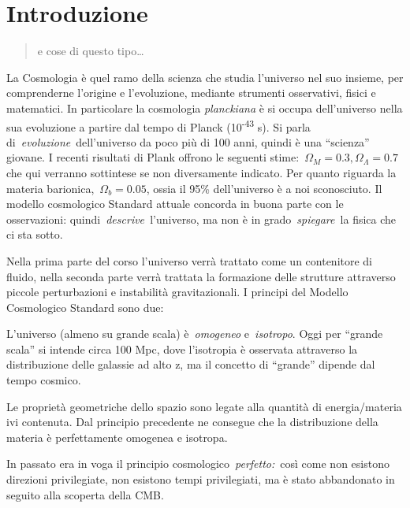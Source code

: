 \chapter{Introduzione}\label{1:chintro}

\begin{quote}
e cose di questo tipo\ldots{}
\end{quote}

La Cosmologia è quel ramo della scienza che studia l'universo nel suo
insieme, per comprenderne l'origine e l'evoluzione, mediante strumenti
osservativi, fisici e matematici. In particolare la
cosmologia \emph{planckiana} è si occupa dell'universo nella sua
evoluzione a partire dal tempo di Planck (10\textsuperscript{-43} s). Si
parla di~\emph{evoluzione}~dell'universo da poco più di 100 anni, quindi
è una ``scienza'' giovane. I recenti risultati di Plank offrono le
seguenti stime:~\(\Omega_{M}=0.3, \Omega_{\Lambda}=0.7\) che qui verranno sottintese se non
diversamente indicato. Per quanto riguarda la materia
barionica,~\(\Omega_b=0.05\), ossia il 95\% dell'universo è a noi
sconosciuto. Il modello cosmologico Standard attuale concorda in buona
parte con le osservazioni: quindi~\emph{descrive~}l'universo, ma non è
in grado~\emph{spiegare~}la fisica che ci sta sotto.

Nella prima parte del corso l'universo verrà trattato come un
contenitore di fluido, nella seconda parte verrà trattata la formazione
delle strutture attraverso piccole perturbazioni e instabilità
gravitazionali. I principi del Modello Cosmologico Standard sono due:

\begin{theorem}
L'universo (almeno su grande scala) è~\emph{omogeneo} e~\emph{isotropo}.
Oggi per ``grande scala'' si intende circa 100 Mpc, dove l'isotropia è
osservata attraverso la distribuzione delle galassie ad alto z, ma il
concetto di ``grande'' dipende dal tempo cosmico.
\end{theorem}

\begin{theorem}
Le proprietà geometriche dello spazio sono legate alla quantità di
energia/materia ivi contenuta. Dal principio precedente ne consegue che
la distribuzione della materia è perfettamente omogenea e isotropa.
\end{theorem}
In passato era in voga il principio cosmologico~\emph{perfetto:}~così
come non esistono direzioni privilegiate, non esistono tempi
privilegiati, ma è stato abbandonato in seguito alla scoperta della
CMB.

